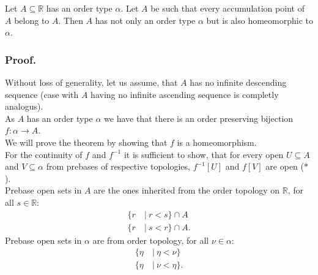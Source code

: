\begin{lemma}\label{order_preserving_homeomorphism_theorem}
Let $A \subseteq \mathbb{R}$ has an order type $\alpha$. 
Let $A$ be such that every accumulation point of $A$ belong to $A$. Then $A$ has not only an
order type $\alpha$ but is also homeomorphic to $\alpha$. 
\end{lemma}
\subsubsection{Proof.}
Without loss of generality, let us assume, that $A$ has no infinite descending sequence 
(case with $A$ having no infinite ascending sequence is completly analogus). \\

As $A$ has an order type $\alpha$ we have that there is an order preserving bijection 
$f : \alpha \to A$. \\
We will prove the theorem by showing that $f$ is a homeomorphism. \\

For the continuity of $f$ and $f^{-1}$ it is sufficient to show, that for every open
$U \subseteq A$ and $V \subseteq \alpha$ 
from prebases of respective topologies, $f^{-1}[U]$ and $f[V]$ are open ($\ast$). \\
Prebase open sets in $A$ are the ones inherited from the order topology on $\mathbb{R}$, 
for all $s \in \mathbb{R}$:
\begin{align*}
\{r\ &|\ r<s\} \cap A\\
\{r\ &|\ s<r\} \cap A.
\end{align*}
Prebase open sets in $\alpha$ are from order topology, for all $\nu \in \alpha$:
\begin{align*}
\{\eta\ &|\ \eta<\nu\} \\
\{\eta\ &|\ \nu<\eta\}.
\end{align*} 


